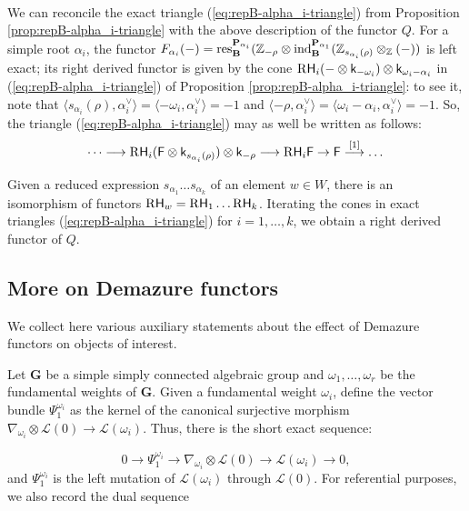 \documentclass[sn-mathphys-num]{sn-jnl}%
\newcommand{\Ll}{\mathcal L}
\newcommand{\ind}{{\mathrm{ind}}}
\newcommand{\res}{{\mathrm{res}}}
\newcommand{\sH}{{\sf H}}
\newcommand{\bg}{\mathbf G}
\theoremstyle{definition}
\begin{document}
\

We can reconcile the exact triangle (\ref{eq:repB-alpha_i-triangle}) from Proposition \ref{prop:repB-alpha_i-triangle} with the above description of the functor $Q$. For a simple root $\alpha _i$, the functor $F_{\alpha _i}(-)={\res}_{\bf B}^{{\bf P}_{\alpha _i}}({\mathbb Z}_{-\rho}\otimes {\ind}_{\bf B}^{{\bf P}_{\alpha _1}}({\mathbb Z}_{s_{\alpha _i}(\rho)}\otimes _{\mathbb Z}(-))$
is left exact; its right derived functor is given by the cone 
${\rm R}{\sH}_i(-\otimes {\sf k}_{-\omega _i})\otimes {\sf k}_{\omega _i-\alpha_i}$
in (\ref{eq:repB-alpha_i-triangle}) of Proposition \ref{prop:repB-alpha_i-triangle}: to see it, note that $\langle s_{\alpha _i}(\rho),\alpha _i^{\vee}\rangle =\langle -\omega _i,\alpha _i^{\vee}\rangle =-1$ and $\langle -
\rho,\alpha _i^{\vee}\rangle = \langle \omega _i-\alpha _i,\alpha _i^{\vee}\rangle =-1$. So, the triangle (\ref{eq:repB-alpha_i-triangle}) may as well be written as follows:
\begin{equation}\label{eq:Q-alpha_i-triangle}
\dots \longrightarrow {\rm R}{\sH}_i({\sf F}\otimes {\sf k}_{s_{\alpha _i}(\rho)})\otimes {\sf k}_{-\rho}\longrightarrow {\rm R}{\sH}_i{\sf F} \rightarrow {\sf F} \stackrel{[1]}\longrightarrow \dots 
\end{equation}

Given a reduced expression $s_{\alpha _1}\dots s_{\alpha _k}$ of an element $w\in W$, there is an isomorphism of functors ${\rm R}{\sH}_w={\rm R}{\sH}_1\dots {\rm R}{\sH}_k$. Iterating the cones in exact triangles (\ref{eq:repB-alpha_i-triangle}) for $i=1,\dots,k$, we obtain a right derived functor of $Q$.

\subsection{More on Demazure functors}
We collect here various auxiliary statements about the effect of Demazure functors on objects of interest.

Let $ \bg$ be a simple simply connected algebraic group and $\omega _1,\dots,\omega _r$ be the fundamental weights of ${ \bg}$. Given a fundamental weight $\omega _i$, define the vector bundle $\Psi _1^{\omega _i}$ as the kernel of the canonical surjective morphism $\nabla _{\omega _i}\otimes \Ll (0)\rightarrow \Ll (\omega _i)$.  Thus, there is the short exact sequence:

\begin{equation}\label{eq:Psi_omega_i}
0\rightarrow \Psi _1^{\omega _i}\rightarrow \nabla _{\omega _i}\otimes \Ll (0)\rightarrow \Ll (\omega _i)\rightarrow 0,
\end{equation}
and $\Psi _1^{\omega _i}$ is the left mutation of $\Ll (\omega _i)$ through $\Ll (0)$. For referential purposes, we also record the dual sequence 
\end{document}
